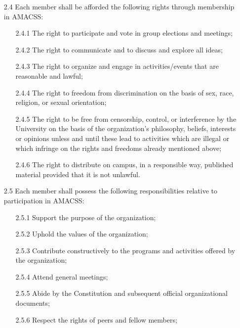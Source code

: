 \documentclass[12pt,a4paper]{article}
\begin{document}
\begin{enumerate}
\item[2.4] Each member shall be afforded the following rights through membership in AMACSS:

\begin{enumerate}
\item[2.4.1] The right to participate and vote in group elections and meetings;

\item[2.4.2] The right to communicate and to discuss and explore all ideas;

\item[2.4.3] The right to organize and engage in activities/events that are reasonable and lawful;

\item[2.4.4] The right to freedom from discrimination on the basis of sex, race, religion, or sexual orientation;

\item[2.4.5] The right to be free from censorship, control, or interference by the University on the basis of the organization's philosophy, beliefs, interests or opinions unless and until these lead to activities which are illegal or which infringe on the rights and freedoms already mentioned above;

\item[2.4.6] The right to distribute on campus, in a responsible way, published material provided that it is not unlawful.
\end{enumerate}

\item[2.5] Each member shall possess the following responsibilities relative to participation in AMACSS:

\begin{enumerate}
\item[2.5.1] Support the purpose of the organization;

\item[2.5.2] Uphold the values of the organization;
\item[2.5.3] Contribute constructively to the programs and activities offered by the organization;

\item[2.5.4] Attend general meetings;

\item[2.5.5] Abide by the Constitution and subsequent official organizational documents;

\item[2.5.6] Respect the rights of peers and fellow members;


\end{enumerate}
\end{enumerate}
\end{document}
